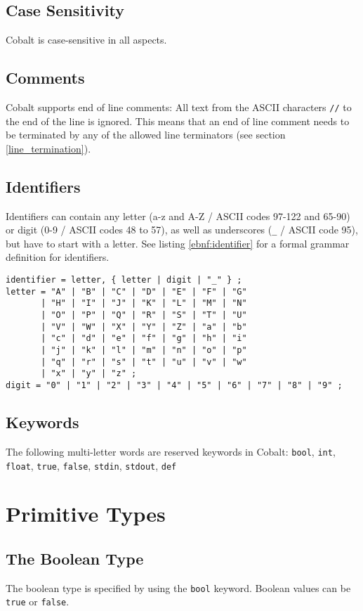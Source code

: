 \documentclass[a4paper,appendixprefix]{scrreprt}
\begin{document}
\section{Case Sensitivity}
Cobalt is case-sensitive in all aspects.

\section{Comments}
Cobalt supports end of line comments: All text from the ASCII characters \verb!//! to the end of the line is ignored. This means that an end of line comment needs to be terminated by any of the allowed line terminators (see section \ref{line_termination}).

\section{Identifiers}
Identifiers can contain any letter (a-z and A-Z / ASCII codes 97-122 and 65-90) or digit (0-9 / ASCII codes 48 to 57), as well as underscores (\verb!_! / ASCII code 95), but have to start with a letter. See listing \ref{ebnf:identifier} for a formal grammar definition for identifiers.

\begin{lstlisting}[label={ebnf:identifier},caption={Identifier Grammar}]
identifier = letter, { letter | digit | "_" } ;
letter = "A" | "B" | "C" | "D" | "E" | "F" | "G"
       | "H" | "I" | "J" | "K" | "L" | "M" | "N"
       | "O" | "P" | "Q" | "R" | "S" | "T" | "U"
       | "V" | "W" | "X" | "Y" | "Z" | "a" | "b"
       | "c" | "d" | "e" | "f" | "g" | "h" | "i"
       | "j" | "k" | "l" | "m" | "n" | "o" | "p"
       | "q" | "r" | "s" | "t" | "u" | "v" | "w"
       | "x" | "y" | "z" ;
digit = "0" | "1" | "2" | "3" | "4" | "5" | "6" | "7" | "8" | "9" ;
\end{lstlisting}

\section{Keywords}
The following multi-letter words are reserved keywords in Cobalt: \verb!bool!, \verb!int!, \verb!float!, \verb!true!, \verb!false!, \verb!stdin!, \verb!stdout!, \verb!def!

\chapter{Primitive Types}

\section{The Boolean Type}
The boolean type is specified by using the \verb!bool! keyword. Boolean values can be \verb!true! or \verb!false!.
\end{document}
